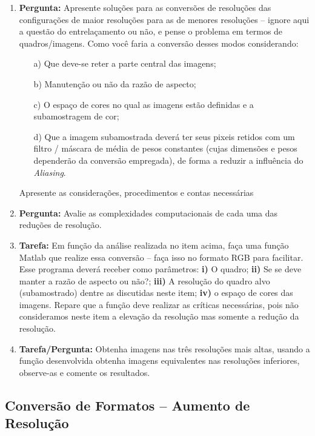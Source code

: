 \documentclass[11pt]{article}
\begin{document}
\begin{enumerate}
\item \textbf{Pergunta:} Apresente soluções para as conversões de resoluções das configurações de maior resoluções para as de menores resoluções -- ignore aqui a questão do entrelaçamento ou não, e pense o problema em termos de quadros/imagens. Como você faria a conversão desses modos considerando:
\begin{enumerate}
\item[a)] Que deve-se reter a parte central das imagens;
\item[b)] Manutenção ou não da razão de aspecto;
\item[c)] O espaço de cores no qual as imagens estão definidas e a subamostragem de cor;
\item[d)] Que a imagem subamostrada deverá ter seus pixeis retidos com um filtro / máscara de média de pesos constantes (cujas dimensões e pesos dependerão da conversão empregada), de forma a reduzir a influência do \emph{Aliasing}.
\end{enumerate}

Apresente as considerações, procedimentos e contas necessárias

\item \textbf{Pergunta:} Avalie as complexidades computacionais de cada uma das reduções de resolução.

\item \textbf{Tarefa:} Em função da análise realizada no item acima, faça uma função \textsf{Matlab} que realize essa conversão -- faça isso no formato RGB para facilitar. Esse programa deverá receber como parâmetros: \textbf{i)} O quadro; \textbf{ii)} Se se deve manter a razão de aspecto ou não?; \textbf{iii)} A resolução do quadro alvo (subamostrado) dentre as discutidas neste item; \textbf{iv)} o espaço de cores das imagens. Repare que a função deve realizar as críticas necessárias, pois não consideramos neste item a elevação da resolução mas somente a redução da resolução.

\item \textbf{Tarefa/Pergunta:} Obtenha imagens nas três resoluções mais altas, usando a função desenvolvida obtenha imagens equivalentes nas resoluções inferiores, observe-as e comente os resultados.

\end{enumerate}

\subsection{Conversão de Formatos -- Aumento de Resolução}
\end{document}
